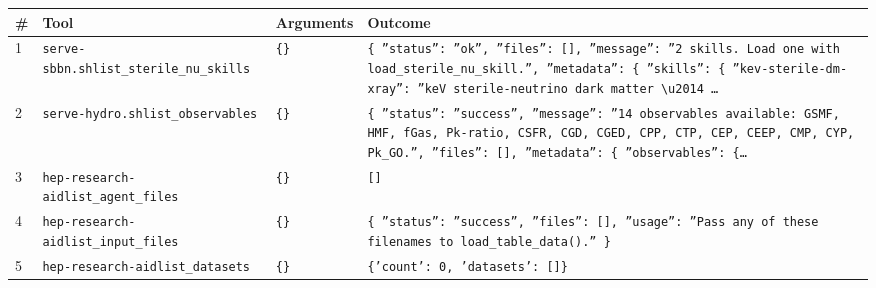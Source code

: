 \documentclass[11pt,a4paper]{article}
\begin{document}
\begin{longtable}{@{}p{}p{}p{}p{}@{}}
\toprule \# & Tool & Arguments & Outcome \\ \midrule \endhead
1 & \texttt{serve-sbbn.sh}\newline\texttt{list\_\allowbreak{}sterile\_\allowbreak{}nu\_\allowbreak{}skills} & \texttt{\{\}\allowbreak{}} & \texttt{\{   ''status'':\allowbreak{} ''ok'',\allowbreak{}   ''files'':\allowbreak{} []\allowbreak{},\allowbreak{}   ''message'':\allowbreak{} ''2 skills. Load one with load\_\allowbreak{}sterile\_\allowbreak{}nu\_\allowbreak{}skill.'',\allowbreak{}   ''metadata'':\allowbreak{} \{     ''skills'':\allowbreak{} \{       ''kev-sterile-dm-xray'':\allowbreak{} ''keV sterile-neutrino dark matter \textbackslash{}\allowbreak{}u2014 \ldots{}\allowbreak{}} \\
2 & \texttt{serve-hydro.sh}\newline\texttt{list\_\allowbreak{}observables} & \texttt{\{\}\allowbreak{}} & \texttt{\{   ''status'':\allowbreak{} ''success'',\allowbreak{}   ''message'':\allowbreak{} ''14 observables available:\allowbreak{} GSMF,\allowbreak{} HMF,\allowbreak{} fGas,\allowbreak{} Pk-ratio,\allowbreak{} CSFR,\allowbreak{} CGD,\allowbreak{} CGED,\allowbreak{} CPP,\allowbreak{} CTP,\allowbreak{} CEP,\allowbreak{} CEEP,\allowbreak{} CMP,\allowbreak{} CYP,\allowbreak{} Pk\_\allowbreak{}GO.'',\allowbreak{}   ''files'':\allowbreak{} []\allowbreak{},\allowbreak{}   ''metadata'':\allowbreak{} \{     ''observables'':\allowbreak{} \{\ldots{}\allowbreak{}} \\
3 & \texttt{hep-research-aid}\newline\texttt{list\_\allowbreak{}agent\_\allowbreak{}files} & \texttt{\{\}\allowbreak{}} & \texttt{[]\allowbreak{}} \\
4 & \texttt{hep-research-aid}\newline\texttt{list\_\allowbreak{}input\_\allowbreak{}files} & \texttt{\{\}\allowbreak{}} & \texttt{\{   ''status'':\allowbreak{} ''success'',\allowbreak{}   ''files'':\allowbreak{} []\allowbreak{},\allowbreak{}   ''usage'':\allowbreak{} ''Pass any of these filenames to load\_\allowbreak{}table\_\allowbreak{}data()\allowbreak{}.'' \}\allowbreak{}} \\
5 & \texttt{hep-research-aid}\newline\texttt{list\_\allowbreak{}datasets} & \texttt{\{\}\allowbreak{}} & \texttt{\{'count':\allowbreak{} 0,\allowbreak{} 'datasets':\allowbreak{} []\allowbreak{}\}\allowbreak{}} \\

\end{longtable}
\end{document}
